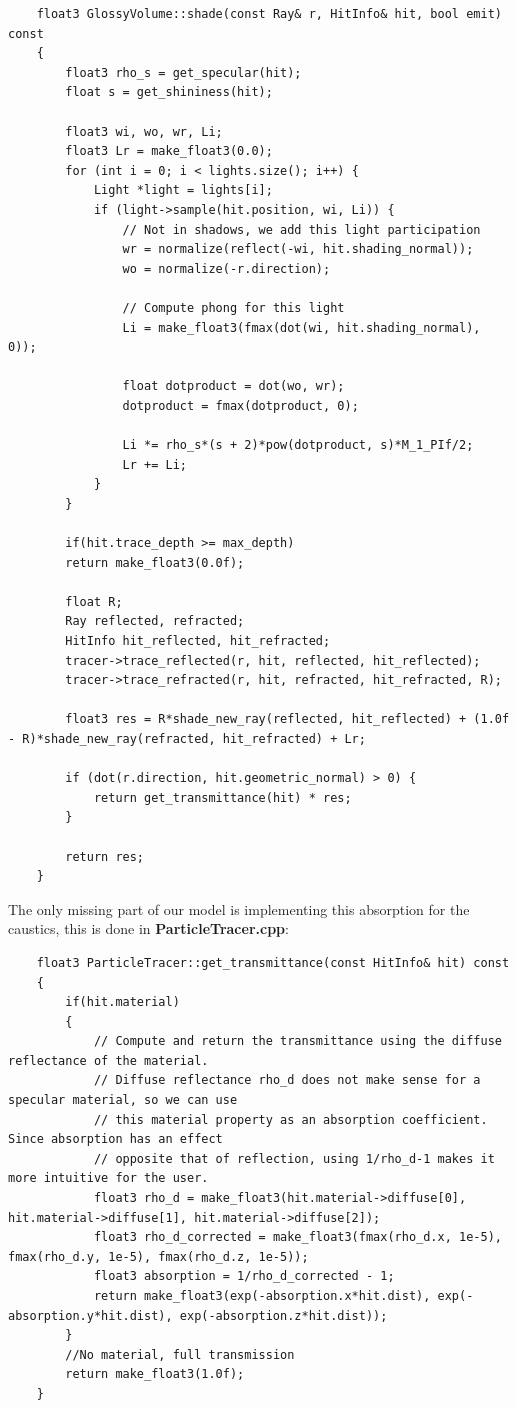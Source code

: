 \documentclass[a4,12pt]{article}
\begin{document}
	\begin{lstlisting}
	float3 GlossyVolume::shade(const Ray& r, HitInfo& hit, bool emit) const
	{
		float3 rho_s = get_specular(hit);
		float s = get_shininess(hit);
		
		float3 wi, wo, wr, Li;
		float3 Lr = make_float3(0.0);
		for (int i = 0; i < lights.size(); i++) {
			Light *light = lights[i];
			if (light->sample(hit.position, wi, Li)) {
				// Not in shadows, we add this light participation
				wr = normalize(reflect(-wi, hit.shading_normal));
				wo = normalize(-r.direction);
				
				// Compute phong for this light
				Li = make_float3(fmax(dot(wi, hit.shading_normal), 0));
				
				float dotproduct = dot(wo, wr);
				dotproduct = fmax(dotproduct, 0);
				
				Li *= rho_s*(s + 2)*pow(dotproduct, s)*M_1_PIf/2;
				Lr += Li;
			}
		}
		
		if(hit.trace_depth >= max_depth)
		return make_float3(0.0f);
		
		float R;
		Ray reflected, refracted;
		HitInfo hit_reflected, hit_refracted;
		tracer->trace_reflected(r, hit, reflected, hit_reflected);
		tracer->trace_refracted(r, hit, refracted, hit_refracted, R);
		
		float3 res = R*shade_new_ray(reflected, hit_reflected) + (1.0f - R)*shade_new_ray(refracted, hit_refracted) + Lr;
		
		if (dot(r.direction, hit.geometric_normal) > 0) {
			return get_transmittance(hit) * res;
		}
		
		return res;
	}
	\end{lstlisting}
	
	The only missing part of our model is implementing this absorption for the caustics, this is done in \textbf{ParticleTracer.cpp}:
	
	\begin{lstlisting}
	float3 ParticleTracer::get_transmittance(const HitInfo& hit) const
	{
		if(hit.material)
		{
			// Compute and return the transmittance using the diffuse reflectance of the material.
			// Diffuse reflectance rho_d does not make sense for a specular material, so we can use
			// this material property as an absorption coefficient. Since absorption has an effect
			// opposite that of reflection, using 1/rho_d-1 makes it more intuitive for the user.
			float3 rho_d = make_float3(hit.material->diffuse[0], hit.material->diffuse[1], hit.material->diffuse[2]);
			float3 rho_d_corrected = make_float3(fmax(rho_d.x, 1e-5), fmax(rho_d.y, 1e-5), fmax(rho_d.z, 1e-5));
			float3 absorption = 1/rho_d_corrected - 1;
			return make_float3(exp(-absorption.x*hit.dist), exp(-absorption.y*hit.dist), exp(-absorption.z*hit.dist));
		}
		//No material, full transmission
		return make_float3(1.0f);
	}
	\end{lstlisting}
	
\end{document}
